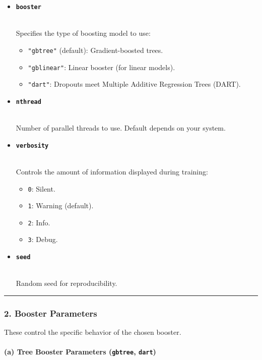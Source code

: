\documentclass[12pt]{book}
\providecommand{\tightlist}{%
  \setlength{\itemsep}{0pt}\setlength{\parskip}{0pt}}
\begin{document}
\begin{itemize}
\item
  \textbf{\texttt{booster}}\strut \\
  Specifies the type of boosting model to use:

  \begin{itemize}
  \tightlist
  \item
    \texttt{"gbtree"} (default): Gradient-boosted trees.
  \item
    \texttt{"gblinear"}: Linear booster (for linear models).
  \item
    \texttt{"dart"}: Dropouts meet Multiple Additive Regression Trees
    (DART).
  \end{itemize}
\item
  \textbf{\texttt{nthread}}\strut \\
  Number of parallel threads to use. Default depends on your system.
\item
  \textbf{\texttt{verbosity}}\strut \\
  Controls the amount of information displayed during training:

  \begin{itemize}
  \tightlist
  \item
    \texttt{0}: Silent.
  \item
    \texttt{1}: Warning (default).
  \item
    \texttt{2}: Info.
  \item
    \texttt{3}: Debug.
  \end{itemize}
\item
  \textbf{\texttt{seed}}\strut \\
  Random seed for reproducibility.
\end{itemize}

\begin{center}\rule{0.5\linewidth}{0.5pt}\end{center}

\subsubsection{\texorpdfstring{\textbf{2. Booster
Parameters}}{2. Booster Parameters}}\label{booster-parameters}

These control the specific behavior of the chosen booster.

\paragraph{\texorpdfstring{\textbf{(a) Tree Booster Parameters
(\texttt{gbtree},
\texttt{dart})}}{(a) Tree Booster Parameters (gbtree, dart)}}\label{a-tree-booster-parameters-gbtree-dart}
\end{document}
